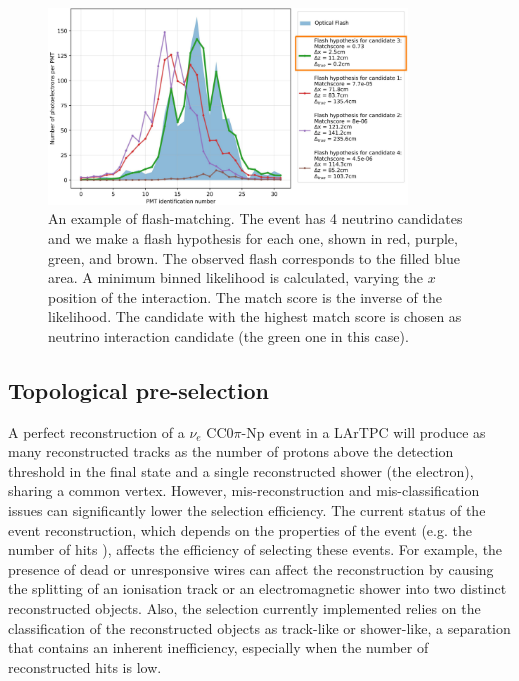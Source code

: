 \begin{figure}[htbp]
\centering
\includegraphics[width=0.85\textwidth]{figures/flashmatch.png} 
\caption{An example of flash-matching. The event has 4 neutrino candidates and we make a flash hypothesis for each one, shown in red, purple, green, and brown. The observed flash corresponds to the filled blue area. A minimum binned likelihood is calculated, varying the $x$ position of the interaction. The match score is the inverse of the likelihood. The candidate with the highest match score is chosen as neutrino interaction candidate (the green one in this case).} 
\label{fig:flashmatch}
\end{figure}

\subsection{Topological pre-selection} \label{sec:topological_pre_selection}
A perfect reconstruction of a $\nu_{e}$ CC0$\pi$-Np event in a LArTPC will produce as many reconstructed tracks as the number of protons above the detection threshold in the final state and a single reconstructed shower (the electron), sharing a common vertex. However, mis-reconstruction and mis-classification issues can significantly lower the selection efficiency. The current status of the event reconstruction, which depends on the properties of the event (e.g. the number of hits \cite{Acciarri:2017hat}), affects the efficiency of selecting these events. For example, the presence of dead or unresponsive wires can affect the reconstruction by causing the splitting of an ionisation track or an electromagnetic shower into two distinct reconstructed objects. Also, the selection currently implemented relies on the classification of the reconstructed objects as track-like or shower-like, a separation that contains an inherent inefficiency, especially when the number of reconstructed hits is low.

